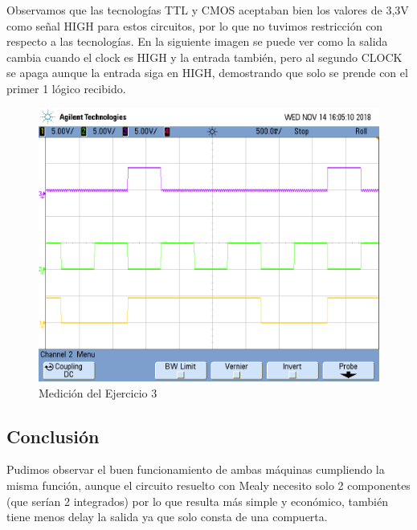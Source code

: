\documentclass[10pt,a4paper]{article}
\begin{document}
Observamos que las tecnologías TTL y CMOS aceptaban bien los valores de 3,3V como señal HIGH para estos circuitos, por lo que no tuvimos restricción con respecto a las tecnologías.
En la siguiente imagen se puede ver como la salida cambia cuando el clock es HIGH y la entrada también, pero al segundo CLOCK se apaga aunque la entrada siga en HIGH, demostrando que solo se prende con el primer 1 lógico recibido.
\begin{figure}[H]
	\centering
	\includegraphics[width=14cm]{Imagenes/MedicionTP3_Ej3.png}
	\caption{Medición del Ejercicio 3}
\end{figure}

\subsection{Conclusión}
Pudimos observar el buen funcionamiento de ambas máquinas cumpliendo la misma función, aunque el circuito resuelto con Mealy necesito solo 2 componentes (que serían 2 integrados) por lo que resulta más simple y económico, también tiene menos delay la salida ya que solo consta de una compuerta.
\end{document}

